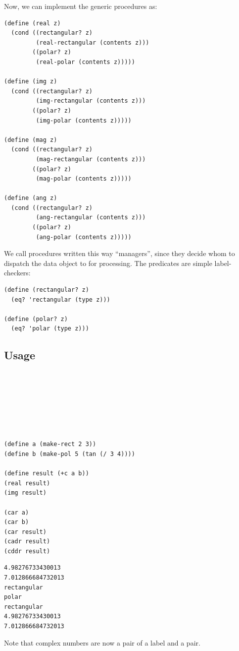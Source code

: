 \documentclass[9pt]{report}
\begin{document}
Now, we can implement the generic procedures as:

\begin{verbatim}
(define (real z)
  (cond ((rectangular? z)
         (real-rectangular (contents z)))
        ((polar? z)
         (real-polar (contents z)))))

(define (img z)
  (cond ((rectangular? z)
         (img-rectangular (contents z)))
        ((polar? z)
         (img-polar (contents z)))))

(define (mag z)
  (cond ((rectangular? z)
         (mag-rectangular (contents z)))
        ((polar? z)
         (mag-polar (contents z)))))

(define (ang z)
  (cond ((rectangular? z)
         (ang-rectangular (contents z)))
        ((polar? z)
         (ang-polar (contents z)))))
\end{verbatim}

We call procedures written this way ``managers'', since they decide
whom to dispatch the data object to for processing. The predicates
are simple label-checkers:

\begin{verbatim}
(define (rectangular? z)
  (eq? 'rectangular (type z)))

(define (polar? z)
  (eq? 'polar (type z)))
\end{verbatim}

\subsection{Usage}
\label{sec:orgb114b24}

\begin{verbatim}







(define a (make-rect 2 3))
(define b (make-pol 5 (tan (/ 3 4))))

(define result (+c a b))
(real result)
(img result)

(car a)
(car b)
(car result)
(cadr result)
(cddr result)
\end{verbatim}

\begin{verbatim}
4.98276733430013
7.012866684732013
rectangular
polar
rectangular
4.98276733430013
7.012866684732013
\end{verbatim}


Note that complex numbers are now a pair of a label and a pair.
\end{document}
